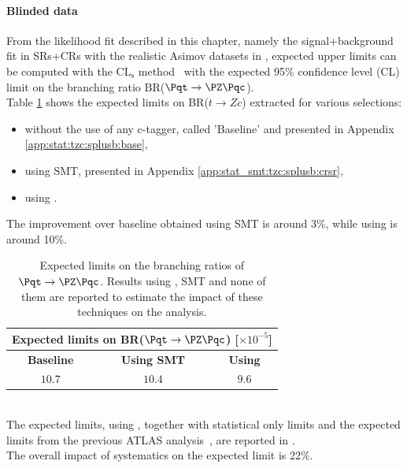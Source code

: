 \paragraph {Blinded data} From the likelihood fit described in this chapter, namely the
signal+background fit in SRs+CRs with the realistic Asimov datasets in ,
expected upper limits can be computed with the $\mathrm{CL_{s}}$ method~\cite{Junk:1999kv,Read:2002hq} with the expected 95\% confidence level (CL) limit on the branching ratio BR($\Pqt\rightarrow\PZ\Pqc$).\\
Table \ref{tab:limits:comparison} shows the expected limits on BR($t \rightarrow Zc$) extracted for various selections: 
\begin{itemize}
	\item without the use of any c-tagger, called 'Baseline' and presented in Appendix \ref{app:stat:tzc:splusb:base},
	\item using SMT, presented in Appendix \ref{app:stat_smt:tzc:splusb:crsr},
	\item using \DLrc.
\end{itemize}
The improvement over baseline obtained using SMT is around 3\%, while using \DLrc is around 10\%.
\begin{table}[htbp]
	\centering
	\begin{tabular}{c|c|c}
		\toprule
		\multicolumn{3}{c}{Expected limits on BR($\Pqt\rightarrow\PZ\Pqc$) [$ \times 10^{-5}$] }\\
		\toprule
		\textbf{Baseline}          & \textbf{Using SMT}			& \textbf{Using \DLrc} \\
		\midrule
		$10.7 $ 	& $ 10.4 $   & $  9.6 $\\
		\bottomrule
	\end{tabular}
	\caption{ Expected limits on the branching ratios of $\Pqt\rightarrow\PZ\Pqc$. 
		Results using \DLrc, SMT and none of them are reported to estimate the impact of these techniques on the analysis.  }%
	\label{tab:limits:comparison}
\end{table}
\\The expected limits, using \DLrc, together
with statistical only limits and the expected limits from the previous ATLAS
analysis~\cite{TOPQ-2017-06}, are reported in
.\\
The overall impact of systematics on the expected limit is 22\%.\\
